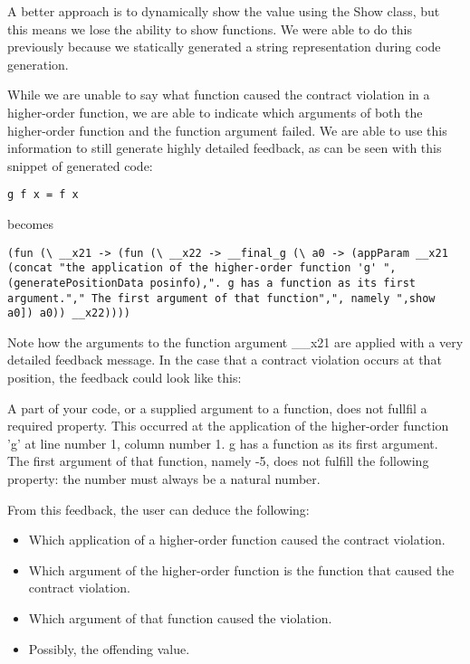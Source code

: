 \documentclass[10pt,a4paper]{article}
\begin{document}
A better approach is to dynamically show the value using the Show class, but this means we lose the ability to show functions.
We were able to do this previously because we statically generated a string representation during code generation.

While we are unable to say what function caused the contract violation in a higher-order function, we are able to indicate which arguments of both the higher-order function and the function argument failed.
We are able to use this information to still generate highly detailed feedback, as can be seen with this snippet of generated code:

\begin{lstlisting}
g f x = f x
\end{lstlisting}

becomes

\begin{lstlisting}
(fun (\ __x21 -> (fun (\ __x22 -> __final_g (\ a0 -> (appParam __x21 (concat "the application of the higher-order function 'g' ",(generatePositionData posinfo),". g has a function as its first argument."," The first argument of that function",", namely ",show a0]) a0)) __x22))))
\end{lstlisting}

Note how the arguments to the function argument \_\_x21 are applied with a very detailed feedback message.
In the case that a contract violation occurs at that position, the feedback could look like this:

A part of your code, or a supplied argument to a function, does not fullfil a required property. This occurred at the application of the higher-order function 'g' at line number 1, column number 1. g has a function as its first argument. The first argument of that function, namely -5, does not fulfill the following property: the number must always be a natural number.

From this feedback, the user can deduce the following:
\begin{itemize}
\item Which application of a higher-order function caused the contract violation.
\item Which argument of the higher-order function is the function that caused the contract violation.
\item Which argument of that function caused the violation.
\item Possibly, the offending value.
\end{itemize}
\end{document}
